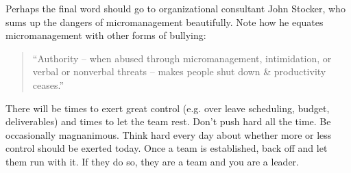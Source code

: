 Perhaps the final word should go to organizational consultant John Stocker, who sums up the dangers of micromanagement beautifully. Note how he equates micromanagement with other forms of bullying:

\begin{quotation}
``Authority -- when abused through micromanagement, intimidation, or verbal or nonverbal threats -- makes people shut down \& productivity ceases.''
\end{quotation}

There will be times to exert great control (e.g. over leave scheduling, budget, deliverables) and times to let the team rest.  Don't push hard all the time.  Be occasionally magnanimous.  Think hard every day about whether more or less control should be exerted today.  Once a team is established, back off and let them run with it.  If they do so, they are a team and you are a leader.


\newpage
\thispagestyle{empty}



